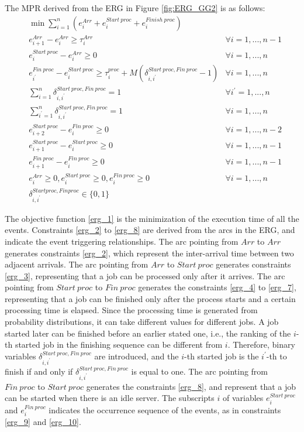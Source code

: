 \documentclass[suppldata]{interact}
\theoremstyle{plain}
\theoremstyle{definition}
\theoremstyle{remark}
\begin{document}
The MPR derived from the ERG in Figure \ref{fig:ERG_GG2} is as follows:
\begin{eqnarray}
&  \min {\sum_{i=1}^n (e^{Arr}_i + e^{Start\ proc}_{i} + e^{Finish\ proc}_{i})} \label{erg_1}\\
& e^{Arr}_{i+1} - e^{Arr}_i \ge \tau^{Arr}_{i} &\forall i=1,...,n-1\label{erg_2}\\
& e^{Start\ proc}_{i} - e^{Arr}_i\ge 0 &\forall i=1,...,n\label{erg_3}\\
& e^{Fin\ proc}_{i^{'}} - e^{Start\ proc}_{i} \ge \tau^{proc}_{i} + M (\delta^{Start\ proc, Fin\ proc}_{i,i^{'}} -1)&\forall i=1,...,n\label{erg_4}\\ 
& \sum_{i=1}^{n} \delta^{Start\ proc, Fin\ proc}_{i,i^{'}} = 1 &\forall i^{'}=1,...,n\label{erg_6}\\
& \sum_{i^{'}=1}^{n} \delta^{Start\ proc, Fin\ proc}_{i,i^{'}} = 1 &\forall i=1,...,n\label{erg_7}\\
& e^{Start\ proc}_{i+2} -  e^{Fin\ proc}_{i} \ge 0 &\forall i=1,...,n-2\label{erg_8}\\
& e^{Start\ proc}_{i+1} - e^{Start\ proc}_{i} \ge 0 &\forall i=1,...,n-1\label{erg_9}\\
& e^{Fin\ proc}_{i+1} - e^{Fin\ proc}_{i} \ge 0 &\forall i=1,...,n-1\label{erg_10}\\
& e^{Arr}_i \ge 0, e^{Start\ proc}_{i} \ge 0, e^{Fin\ proc}_{i}\ge 0 &\forall i=1,...,n \label{erg_11} \\
& \delta^{Start proc, Fin proc}_{i,i^{'}} \in \{0,1\}
\end{eqnarray}

The objective function \eqref{erg_1} is the minimization of the execution time of all the events. Constraints \eqref{erg_2} to \eqref{erg_8} are derived from the arcs in the ERG, and indicate the event triggering relationships. The arc pointing from $Arr$ to $Arr$ generates constraints \eqref{erg_2}, which represent the inter-arrival time between two adjacent arrivals. The arc pointing from $Arr$ to $Start\ proc$ generates  constraints \eqref{erg_3}, representing that a job can be processed only after it arrives. The arc pointing from $Start\ proc$ to $Fin\ proc$ generates the constraints \eqref{erg_4} to \eqref{erg_7}, representing that a job can be finished only after the process starts and a certain processing time is elapsed. Since the processing time is generated from probability distributions, it can take different values for different jobs. A job started later can be finished before an earlier stated one, i.e., the ranking of the $i$-th started job in the finishing sequence can be different from $i$. Therefore, binary variables $\delta^{Start\ proc, Fin\ proc}_{i,i^{'}}$ are introduced, and the $i$-th started job is the $i^{'}$-th to finish if and only if $\delta^{Start\ proc, Fin\ proc}_{i,i^{'}}$ is equal to one. The arc pointing from $Fin\ proc$ to $Start\ proc$ generates the constraints \eqref{erg_8}, and represent that a job can be started when there is an idle server. The subscripts $i$ of variables $e^{Start\ proc}_{i}$ and $e^{Fin\ proc}_{i}$ indicates the occurrence sequence of the events, as in constraints \eqref{erg_9} and \eqref{erg_10}. 
\end{document}
